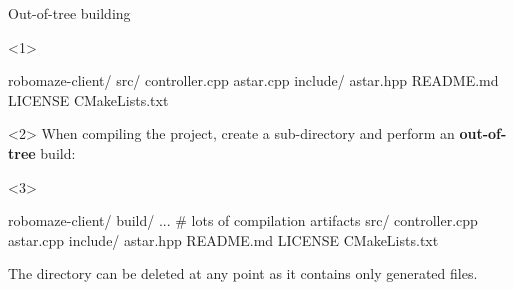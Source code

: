 \documentclass[compress]{beamer}
\begin{document}
\begin{frame}[fragile]{Out-of-tree building}

\begin{onlyenv}<1>
\begin{shcode}
robomaze-client/
  src/
    controller.cpp
    astar.cpp
  include/
    astar.hpp
  README.md
  LICENSE
  CMakeLists.txt
\end{shcode}

\end{onlyenv}

\begin{onlyenv}<2>
When compiling the project, create a sub-directory  and perform an
    \textbf{out-of-tree} build:


\end{onlyenv}

\begin{onlyenv}<3>

\begin{shcode}
robomaze-client/
  build/
    ... # lots of compilation artifacts
  src/
    controller.cpp
    astar.cpp
  include/
    astar.hpp
  README.md
  LICENSE
  CMakeLists.txt
\end{shcode}

    The  directory can be deleted at any point as it contains only
    generated files.
\end{onlyenv}
\end{frame}
\end{document}
